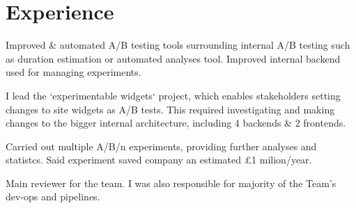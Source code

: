 \documentclass[]{CV}
\begin{document}
%
%


%
%

\begin{minipage}[t]{0.705\textwidth} 



\section{Experience}
\vspace{\topsep} %
\quad
\begin{tightemize}

\item Improved \& automated A/B testing tools surrounding internal A/B testing such as duration estimation or automated analyses tool. Improved internal backend used for managing experiments.

\item I lead the `experimentable widgets` project, which enables stakeholders setting changes to site widgets as A/B tests. This required investigating and making changes to the bigger internal architecture, including 4 backends \& 2 frontends.

\item Carried out multiple A/B/n experiments, providing further analyses and statistcs. Said experiment saved company an estimated £1 milion/year.

\item Main reviewer for the team. I was also responsible for majority of the Team's dev-ops and pipelines.

\quad
\end{tightemize}


\end{minipage}
\end{document}
